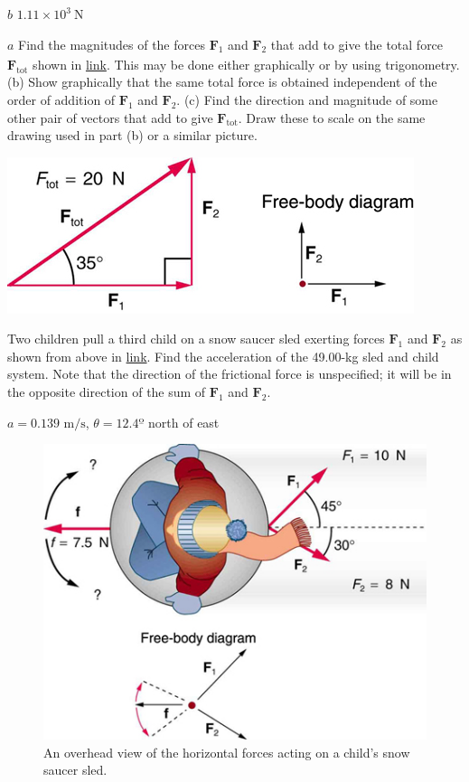\documentclass[
]{book}
\begin{document}
\(b\) \({1\text{.}{\text{11} \times \text{10}^{3}}\ \text{N}}{}\)

\hypertarget{fs-id1333485}{}
\leavevmode{}%
\(a\) Find the magnitudes of the forces \(\textbf{F}_{1}{}\) and
\(\textbf{F}_{2}{}\)\textsubscript{} that add to give the
total force \(\textbf{F}_{\text{tot}}{}\) shown in
\protect\hyperlink{import-auto-id2639094}{link}. This may be done
either graphically or by using trigonometry. (b) Show graphically that
the same total force is obtained independent of the order of addition of
\(\textbf{F}_{1}{}\) and \(\textbf{F}_{2}{}\). (c) Find the direction and
magnitude of some other pair of vectors that add to give
\(\textbf{F}_{\text{tot}}{}\). Draw these to scale on the same drawing
used in part (b) or a similar picture.

\includegraphics{images/Figure_04_06_04.jpg}

\hypertarget{fs-id2159386}{}
\leavevmode{}%
Two children pull a third child on a snow saucer sled exerting forces
\(\textbf{F}_{1}\) and \(\textbf{F}_{2}\) as shown from above in
\protect\hyperlink{import-auto-id1789737}{link}. Find the
acceleration of the 49.00-kg sled and child system. Note that the
direction of the frictional force is unspecified; it will be in the
opposite direction of the sum of \(\textbf{F}_{1}\) and \(\textbf{F}_{2}\).

\leavevmode{}%
\(a = \text{0.139\ m/s}\), \(\theta = 12.4º\) north of east

\begin{figure}
\hypertarget{import-auto-id1789737}{%
\centering
\includegraphics{images/Figure_04_06_05.jpg}
\caption{An overhead view of the horizontal forces acting on a child's snow
saucer sled.}\label{import-auto-id1789737}
}
\end{figure}
\end{document}
